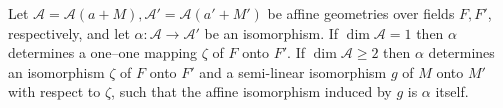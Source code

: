 Let $\mathcal{A} = \mathcal{A}(a+M), \mathcal{A}' = \mathcal{A}(a'+M')$ be affine geometries over fields $F, F'$, respectively, and let $\alpha: \mathcal{A} \to \mathcal{A}'$ be an isomorphism. If $\dim \mathcal{A} = 1$ then $\alpha$ determines a one--one mapping $\zeta$ of $F$ onto $F'$. If $\dim \mathcal{A} \geq 2$ then $\alpha$ determines an isomorphism $\zeta$ of $F$ onto $F'$ and a semi-linear isomorphism $g$ of $M$ onto $M'$ with respect to $\zeta$, such that the affine isomorphism induced by $g$ is $\alpha$ itself.
